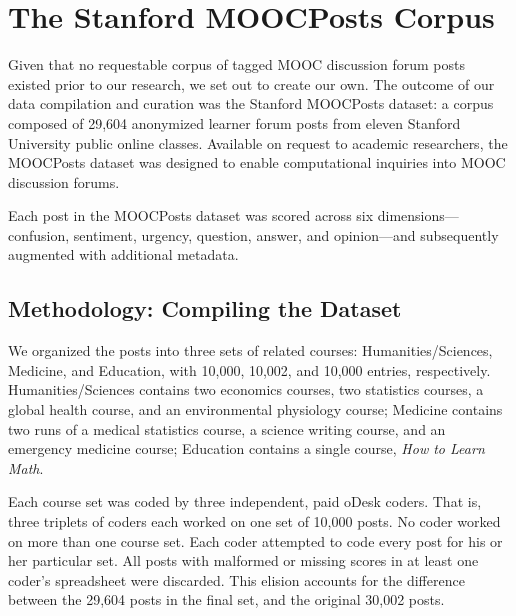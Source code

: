 \documentclass{edm_template}
\begin{document}
\section{The Stanford MOOCPosts Corpus}
\label{sec:MOOCPosts}

Given that no requestable corpus of tagged MOOC discussion forum posts existed prior to our research, we set out to create our own. The outcome of our data compilation and curation was the Stanford MOOCPosts dataset: a corpus composed of 29,604 anonymized learner forum posts from eleven Stanford University public online classes. Available on request to academic researchers, the MOOCPosts dataset was designed to enable computational inquiries into MOOC discussion forums.

Each post in the MOOCPosts dataset was scored across six dimensions---confusion, sentiment, urgency, question, answer, and opinion---and subsequently augmented with additional metadata.


\subsection{Methodology: Compiling the Dataset}
We organized the posts into three sets of related courses: Humanities/Sciences, Medicine, and Education, with 10,000, 10,002, and 10,000 entries, respectively. Humanities/Sciences contains two economics courses, two statistics courses, a global health course, and an environmental physiology course; Medicine contains two runs of a medical statistics course, a science writing course, and an emergency medicine course; Education contains a single course, \emph{How to Learn Math}. 

Each course set was coded by three independent, paid oDesk coders. That is, three triplets of coders each worked on one set of 10,000 posts. No coder worked on more than one course set. Each coder attempted to code every post for his or her particular set. All posts with malformed or missing scores in at least one coder's spreadsheet were discarded. This elision accounts for the difference between the 29,604 posts in the final set, and the original 30,002 posts.
\end{document}
